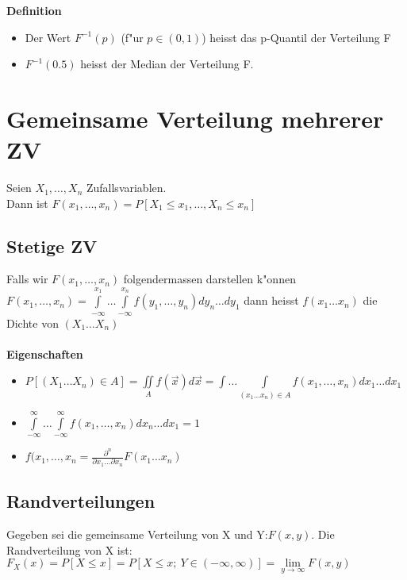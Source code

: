 \documentclass[10pt, a4paper, twocolumn]{scrartcl}
\begin{document}
\textbf{Definition}
\begin{itemize}
 \item Der Wert $F^{-1}(p)$ (f"ur $p\in(0,1)$) heisst das p-Quantil der Verteilung F
 \item $F^{-1}(0.5)$ heisst der Median der Verteilung F.
\end{itemize}

\section{Gemeinsame Verteilung mehrerer ZV}

Seien $X_1,\ldots,X_n$ Zufallsvariablen.\\

Dann ist $F(x_1,\ldots,x_n)=P[X_1\leq x_1,\ldots,X_n\leq x_n]$

\subsection{Stetige ZV}

Falls wir $F(x_1,\ldots,x_n)$ folgendermassen darstellen k"onnen $F(x_1,\ldots,x_n)=\int\limits^{x_1}_{-\infty}\ldots\int\limits^{x_n}_{-\infty}f(y_1,\ldots,y_n)dy_n\ldots dy_1$ dann heisst $f(x_1\ldots x_n)$ die Dichte von $(X_1\ldots X_n)$\\\\

\textbf{Eigenschaften}
\begin{itemize}
 \item $P[(X_1\ldots X_n)\in A]=\iint\limits_A f(\vec{x})d\vec{x}=\int\ldots\int\limits_{(x_1\ldots x_n)\in A}f(x_1,\ldots,x_n)dx_1\ldots dx_1$
 \item $\int\limits^\infty_{-\infty}\ldots\int\limits^\infty_{-\infty}f(x_1,\ldots,x_n)dx_n\ldots dx_1=1$\\
 \item $f(x_1,\ldots,x_n=\frac{\partial^n}{\partial x_1\ldots \partial x_n}F(x_1 \ldots x_n)$
\end{itemize}

\subsection{Randverteilungen}

Gegeben sei die gemeinsame Verteilung von X und Y:$F(x,y)$. Die Randverteilung von X ist:\\
$F_X(x)=P[X\leq x]=P[X\leq x;\:Y\in(-\infty,\infty)]=\lim\limits_{y\rightarrow \infty}F(x,y)$\\\\
\end{document}

